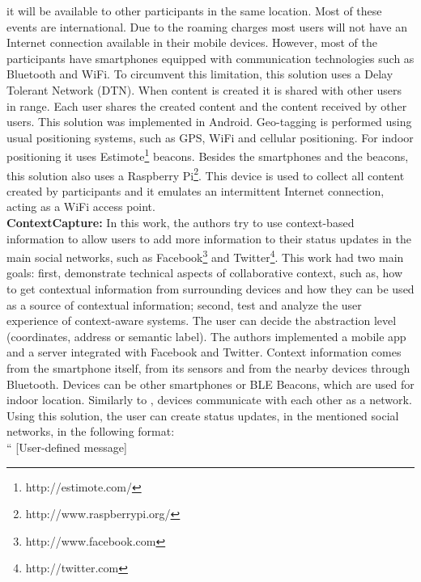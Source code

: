 it will be available to other participants in the same
location.
Most of these events are international. 
Due to the
roaming charges most users will not have an
Internet connection available in their mobile devices.
However, most of the participants have smartphones
equipped with communication technologies such as
Bluetooth and WiFi.
To circumvent this limitation, this solution
uses a Delay Tolerant Network (DTN)\cite{pateldelay}.
When content is created it is shared with other
users in range. Each user shares the created content and the content received by other users.
This solution was implemented in Android.
Geo-tagging is performed using usual positioning
systems, such as GPS, WiFi and cellular positioning.
For indoor positioning it uses 
Estimote\footnote{http://estimote.com/} beacons.
Besides the smartphones and the beacons, this
solution also uses a 
Raspberry Pi\footnote{http://www.raspberrypi.org/}.
This device is used to collect all content created by
participants and it emulates an intermittent Internet
connection, acting as a WiFi access point.
\\
\textbf{ContextCapture\cite{Antila2011}:}
In this work, the authors try to use
context-based information to allow users to
add more information to their status updates
in the main social networks, such as
Facebook\footnote{http://www.facebook.com} and 
Twitter\footnote{http://twitter.com}.
This work had two main goals: first, demonstrate technical
aspects of collaborative context, such as,
how to get contextual information from
surrounding devices and how they can be used
as a source of contextual information;
second, test and analyze the user experience of
context-aware systems.
The user can decide the abstraction level (coordinates,
address or semantic label).
The authors implemented a mobile app and a
server integrated with Facebook and Twitter.
Context information comes from the smartphone itself,
from its sensors and from the nearby devices through
Bluetooth. 
Devices can be other smartphones or BLE Beacons, which
are used for indoor location.
Similarly to \cite{BenAbdesslem2014}, devices communicate
with each other as a network.
Using this solution, the user can create status updates,
in the mentioned social networks, in the following format:
\\
``
[User-defined message] 

